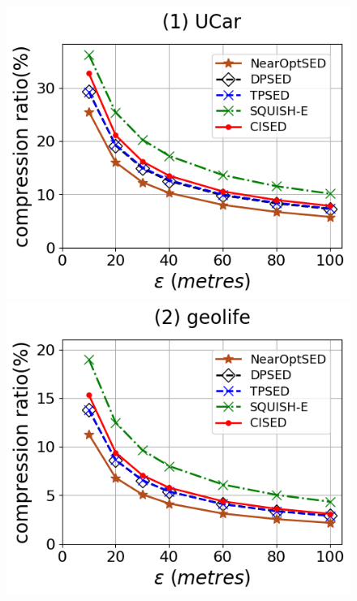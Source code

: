 \begin{figure}[tb!]
	\centering
	\includegraphics[scale=0.315]{Figures/Exp-SED-CR-epsilon-service.png} 	\hspace{1ex}
	\includegraphics[scale=0.315]{Figures/Exp-SED-CR-epsilon-geolife.png}	\hspace{1ex}

\end{figure}
